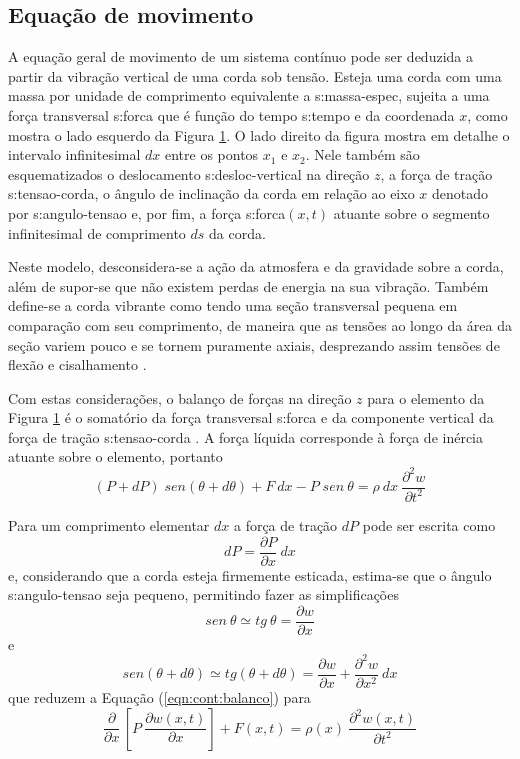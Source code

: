 \documentclass[12pt,openright,oneside,a4paper,
	chapter=TITLE,section=TITLE,
	english,brazil]{abntex2}
\begin{document}
	\subsection{Equação de movimento} \label{desenv:cont:eqn-geral}
	A equação geral de movimento de um sistema contínuo pode ser deduzida a partir da vibração vertical de uma corda sob tensão. Esteja uma corda com uma massa por unidade de comprimento equivalente a \gls{s:massa-espec}, sujeita a uma força transversal \gls{s:forca} que é função do tempo \gls{s:tempo} e da coordenada $x$, como mostra o lado esquerdo da Figura \ref{fig:vibracao-corda}. O lado direito da figura mostra em detalhe o intervalo infinitesimal $dx$ entre os pontos $x_1$ e $x_2$. Nele também são esquematizados o deslocamento \gls{s:desloc-vertical} na direção $z$, a força de tração \gls{s:tensao-corda}, o ângulo de inclinação da corda em relação ao eixo $x$ denotado por \gls{s:angulo-tensao} e, por fim, a força \gls{s:forca}$(x,t)$ atuante sobre o segmento infinitesimal de comprimento $ds$ da corda.
	\begin{figure}[t] 
	 \label{fig:vibracao-corda}
	\end{figure}

	Neste modelo, desconsidera-se a ação da atmosfera e da gravidade sobre a corda, além de supor-se que não existem perdas de energia na sua vibração. Também define-se a corda vibrante como tendo uma seção transversal pequena em comparação com seu comprimento, de maneira que as tensões ao longo da área da seção variem pouco e se tornem puramente axiais, desprezando assim tensões de flexão e cisalhamento \cite{clark:1972}.
	
	Com estas considerações, o balanço de forças na direção $z$ para o elemento da Figura \ref{fig:vibracao-corda} é o somatório da força transversal \gls{s:forca} e da componente vertical da força de tração \gls{s:tensao-corda} \cite{rao:2008}. A força líquida corresponde à força de inércia atuante sobre o elemento, portanto
	\begin{equation} \label{eqn:cont:balanco}
		(P + dP)\;sen(\theta + d\theta) + F\:dx - P\;sen\:\theta = \rho\:dx\:\frac{\partial^2 w}{\partial t^2}
	\end{equation}
	
	Para um comprimento elementar $dx$ a força de tração $dP$ pode ser escrita como \[dP = \frac{\partial P}{\partial x}\:dx\] e, considerando que a corda esteja firmemente esticada, estima-se que o ângulo \gls{s:angulo-tensao} seja pequeno, permitindo fazer as simplificações \[sen\:\theta \simeq tg\:\theta = \frac{\partial w}{\partial x} \] e \[sen(\theta + d\theta) \simeq tg(\theta + d\theta) = \frac{\partial w}{\partial x} + \frac{\partial^2 w}{\partial x^2}\:dx \] que reduzem a Equação (\ref{eqn:cont:balanco}) para \[\frac{\partial}{\partial x}\,\left[P\:\frac{\partial w(x,t)}{\partial x}\right] + F(x,t) = \rho(x)\:\frac{\partial^2 w(x,t)}{\partial t^2} \]
	
\end{document}
